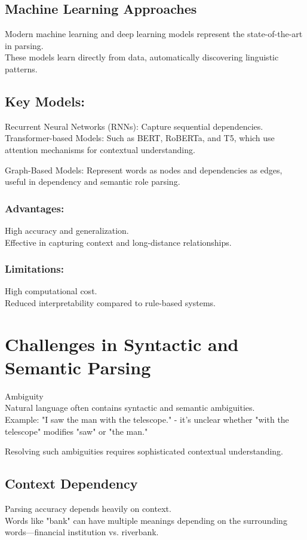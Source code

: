 \documentclass[10pt]{article}
\begin{document}
\subsection*{Machine Learning Approaches}
Modern machine learning and deep learning models represent the state-of-the-art in parsing.\\
These models learn directly from data, automatically discovering linguistic patterns.

\subsection*{Key Models:}
Recurrent Neural Networks (RNNs): Capture sequential dependencies.\\
Transformer-based Models: Such as BERT, RoBERTa, and T5, which use attention mechanisms for contextual understanding.

Graph-Based Models: Represent words as nodes and dependencies as edges, useful in dependency and semantic role parsing.

\subsubsection*{Advantages:}
High accuracy and generalization.\\
Effective in capturing context and long-distance relationships.\\
\subsubsection*{Limitations:}
High computational cost.\\
Reduced interpretability compared to rule-based systems.

\section*{Challenges in Syntactic and Semantic Parsing}
Ambiguity\\
Natural language often contains syntactic and semantic ambiguities.\\
Example: "I saw the man with the telescope." - it's unclear whether "with the telescope" modifies "saw" or "the man."

Resolving such ambiguities requires sophisticated contextual understanding.

\subsection*{Context Dependency}
Parsing accuracy depends heavily on context.\\
Words like "bank" can have multiple meanings depending on the surrounding words—financial institution vs. riverbank.
\end{document}
